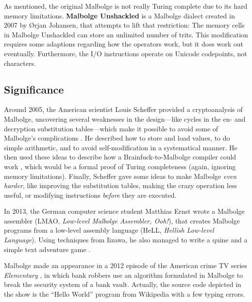 As mentioned, the original Malbolge is not really Turing complete due to its hard memory limitations. \textbf{Malbolge Unshackled} is a Malbolge dialect created in 2007 by Ørjan Johansen, that attempts to lift that restriction: The memory cells in Malbolge Unshackled can store an unlimited number of trits. This modification requires some adaptions regarding how the operators work, but it does work out eventually. Furthermore, the I/O instructions operate on Unicode codepoints, not \ascii{} characters.

\subsection{Significance}

Around 2005, the American scientist Louis Scheffer provided a cryptoanalysis of Malbolge, uncovering several weaknesses in the design---like cycles in the en- and decryption substitution tables---which make it possible to avoid some of Malbolge's complications \cite{scheffer_introduction}. He described how to store and load values, to do simple arithmetic, and to avoid self-modification in a systematical manner. He then used these ideas to describe how a Brainfuck-to-Malbolge compiler could work \cite{scheffer_writing}, which would be a formal proof of Turing completeness (again, ignoring memory limitations). Finally, Scheffer gave some ideas to make Malbolge \emph{even harder}, like improving the substitution tables, making the crazy operation less useful, or modifying instructions \emph{before} they are executed.

In 2013, the German computer science student Matthias Ernst wrote a Malbolge assembler (LMAO, \emph{Low-level Malbolge Assembler, Ooh!}), that creates Malbolge programs from a low-level assembly language (HeLL, \emph{Hellish Low-level Language}). Using techniques from Iizawa, he also managed to write a quine and a simple text adventure game \cite{ernst_malbolge}.

Malbolge made an appearance in a 2012 episode of the American crime TV series \emph{Elementary} \cite{hamilton2012esoteric}, in which bank robbers use an algorithm formulated in Malbolge to break the security system of a bank vault. Actually, the source code depicted in the show is the “Hello World” program from Wikipedia with a few typing errors.
